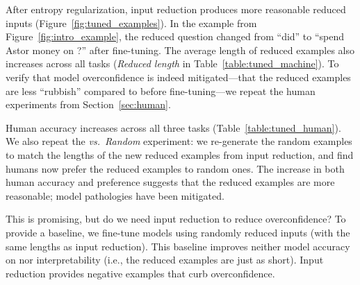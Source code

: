 After entropy regularization, input reduction produces more reasonable
reduced inputs (Figure~\ref{fig:tuned_examples}).
In the \squad{} example from Figure~\ref{fig:intro_example}, the reduced
question changed from ``did'' to ``spend Astor money on ?'' after fine-tuning.
The average length of reduced examples also increases across all tasks
(\emph{Reduced length} in Table~\ref{table:tuned_machine}).
To verify that model overconfidence is indeed mitigated---that the reduced
examples are less ``rubbish'' compared to before fine-tuning---we repeat the
human experiments from Section~\ref{sec:human}.

Human accuracy increases across all three tasks (Table~\ref{table:tuned_human}).
We also repeat the \emph{vs.\ Random} experiment: we re-generate the random
examples to match the lengths of the new reduced examples from input
reduction, and find humans now prefer the reduced examples to random ones.
The increase in both human accuracy and preference suggests that the reduced
examples are more reasonable; model pathologies have been mitigated.

This is promising, but do we need input reduction to reduce
overconfidence?  To provide a baseline, we fine-tune
models using randomly reduced inputs (with the same lengths as input
reduction). This baseline improves neither model accuracy on nor
interpretability (i.e., the reduced examples are just as short).
Input reduction provides negative examples that
curb overconfidence.

